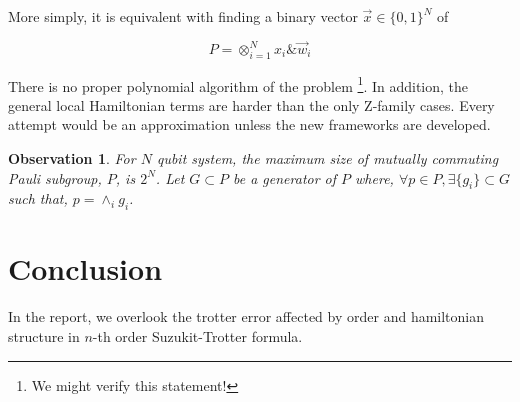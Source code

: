 \documentclass[a4paper,12pt]{article}
\newtheorem{observation}{Observation}
\begin{document}
More simply, it is equivalent with finding a binary vector $\vec{x} \in \{0, 1\}^N$ of 

\begin{equation}
    P = \otimes_{i=1}^N x_i \& \vec{w}_i
\end{equation}

There is no proper polynomial algorithm of the problem
\footnote{We might verify this statement!}.
In addition, the general local Hamiltonian terms are harder than the only Z-family cases.
Every attempt would be an approximation unless the new frameworks are developed.

\begin{observation}
For $N$ qubit system, the maximum size of mutually commuting Pauli subgroup, $P$, is $2^N$.
Let $G \subset P$ be a generator of $P$ where, $\forall p \in P, \exists \{g_i\} \subset G$
such that, $p = \wedge_i g_i$.
\end{observation}


\section{Conclusion}

In the report, we overlook the trotter error affected by order and hamiltonian structure 
in $n$-th order Suzukit-Trotter formula.

  
  
\end{document}
